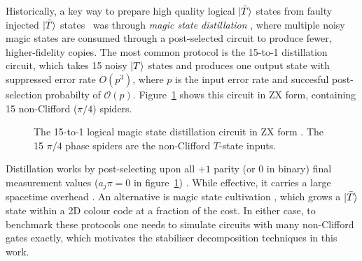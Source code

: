 \documentclass[a4paper,onecolumn,11pt,accepted=2026-06-10]{quantumarticle}
\begin{document}
Historically, a key way to prepare high quality logical $\ket{\bar{T}}$ states from faulty injected $\ket{\bar{T}}$ states~\cite{Li_2015} was through \textit{magic state distillation} \cite{Bravyi_2005}, where multiple noisy magic states are consumed through a post-selected circuit to produce fewer, higher-fidelity copies. The most common protocol is the 15-to-1 distillation circuit, which takes 15 noisy $\ket{T}$ states and produces one output state with suppressed error rate $O(p^3)$, where $p$ is the input error rate and succesful post-selection probabilty of $\mathcal{O}(p)$. Figure~\ref{fig:15to1} shows this circuit in ZX form, containing 15 non-Clifford ($\pi/4$) spiders.
\begin{figure}[h]
\centering
    \caption{The 15-to-1 logical magic state distillation circuit in ZX form \cite{Litinski_2019}. The 15 $\pi/4$ phase spiders are the non-Clifford $T$-state inputs. 
    }
    \label{fig:15to1}
\end{figure}
Distillation works by post-selecting upon all $+1$ parity (or $0$ in binary) final measurement values ($a_j\pi = 0$ in figure~\ref{fig:15to1}) \cite{Bravyi_2005}. While effective, it carries a large spacetime overhead \cite{Litinski_2019, Litinski2019game}. An alternative is magic state cultivation \cite{gidney2024magicstatecultivationgrowing}, which grows a $\ket{\bar{T}}$ state within a 2D colour code at a fraction of the cost. In either case, to benchmark these protocols one needs to simulate circuits with many non-Clifford gates exactly, which motivates the stabiliser decomposition techniques in this work.
\end{document}
